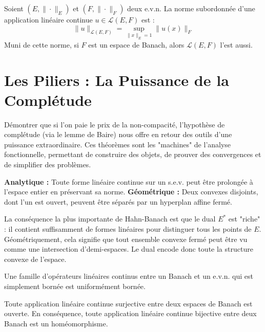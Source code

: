 \begin{definition}
    Soient $(E, \|\cdot\|_E)$ et $(F, \|\cdot\|_F)$ deux e.v.n. La norme subordonnée d'une application linéaire continue $u \in \mathcal{L}(E,F)$ est :
    $$ \|u\|_{\mathcal{L}(E,F)} = \sup_{\|x\|_E=1} \|u(x)\|_F $$
    Muni de cette norme, si $F$ est un espace de Banach, alors $\mathcal{L}(E,F)$ l'est aussi.
\end{definition}

\section{Les Piliers : La Puissance de la Complétude}

\begin{objectif}
    Démontrer que si l'on paie le prix de la non-compacité, l'hypothèse de complétude (via le lemme de Baire) nous offre en retour des outils d'une puissance extraordinaire. Ces théorèmes sont les "machines" de l'analyse fonctionnelle, permettant de construire des objets, de prouver des convergences et de simplifier des problèmes.
\end{objectif}

\begin{theorem}
    \textbf{Analytique :} Toute forme linéaire continue sur un s.e.v. peut être prolongée à l'espace entier en préservant sa norme.
    \textbf{Géométrique :} Deux convexes disjoints, dont l'un est ouvert, peuvent être séparés par un hyperplan affine fermé.
\end{theorem}

\begin{application}
    La conséquence la plus importante de Hahn-Banach est que le dual $E^*$ est "riche" : il contient suffisamment de formes linéaires pour distinguer tous les points de $E$. Géométriquement, cela signifie que tout ensemble convexe fermé peut être vu comme une intersection d'demi-espaces. Le dual encode donc toute la structure convexe de l'espace.
\end{application}

\begin{theorem}
    Une famille d'opérateurs linéaires continus entre un Banach et un e.v.n. qui est simplement bornée est uniformément bornée.
\end{theorem}

\begin{theorem}
    Toute application linéaire continue surjective entre deux espaces de Banach est ouverte. En conséquence, toute application linéaire continue bijective entre deux Banach est un homéomorphisme.
\end{theorem}

